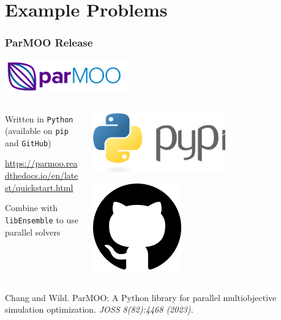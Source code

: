 \documentclass[aspectratio=169]{beamer}
\begin{document}
\section{Example Problems}

\begin{frame}\frametitle{ParMOO Release}

\begin{center}
\includegraphics[width=0.4\textwidth]{../img/logos/logo-parmoo.png}
\end{center}

\begin{columns}
\begin{column}{0.8\textwidth}

Written in {\tt Python} (available on {\tt pip} and {\tt GitHub})

\bigskip
\bigskip
\url{https://parmoo.readthedocs.io/en/latest/quickstart.html}

\bigskip
\bigskip
Combine with {\tt libEnsemble} to use parallel solvers
\end{column}
\begin{column}{0.2\textwidth}
\includegraphics[width=0.6\textwidth]{../img/logos/logo-py.png}

\bigskip

\includegraphics[width=0.4\textwidth]{../img/logos/logo-gh.png}
\end{column}
\end{columns}

\bigskip
\bigskip

{\tiny
Chang and Wild.
ParMOO: A Python library for parallel multiobjective simulation optimization.
{\sl JOSS 8(82):4468 (2023).}
}

\end{frame}
\end{document}
